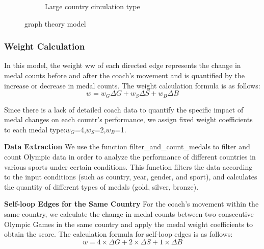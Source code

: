 \documentclass{mcmthesis}
\begin{document}
\begin{figure}[H]
\begin{subfigure}{0.45\textwidth}
        \caption{Large country circulation type}
        \label{subfig:player2}
    \end{subfigure}
    \caption{graph theory model}
    \label{Figure 13}
\end{figure}

\subsubsection{Weight Calculation}
In this model, the weight ww of each directed edge represents the change in medal counts before and after the coach's movement and is quantified by the increase or decrease in medal counts. The weight calculation formula is as follows:
\begin{equation}
    w=w_G\Delta G+w_S\Delta S+w_B\Delta B
\end{equation}


Since there is a lack of detailed coach data to quantify the specific impact of medal changes on each countr's performance, we assign fixed weight coefficients to each medal type:$w_G$=4,$w_S$=2,$w_B$=1.

{\bf Data Extraction}
We use the function filter\_and\_count\_medals to filter and count Olympic data in order to analyze the performance of different countries in various sports under certain conditions. This function filters the data according to the input conditions (such as country, year, gender, and sport), and calculates the quantity of different types of medals (gold, silver, bronze).

{\bf Self-loop Edges for the Same Country}
For the coach's movement within the same country, we calculate the change in medal counts between two consecutive Olympic Games in the same country and apply the medal weight coefficients to obtain the score. The calculation formula for self-loop edges is as follows:
\begin{equation}w=4\times\Delta G+2\times\Delta S+1\times\Delta B\end{equation}






\end{document}
